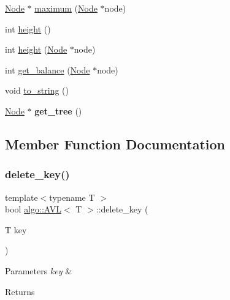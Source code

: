 \begin{DoxyCompactItemize}
\item 
\hyperlink{structalgo_1_1_a_v_l_1_1_node}{Node} $\ast$ \hyperlink{classalgo_1_1_a_v_l_a83534f4b9ca490fba2394d3d649b2175}{maximum} (\hyperlink{structalgo_1_1_a_v_l_1_1_node}{Node} $\ast$node)
\item 
int \hyperlink{classalgo_1_1_a_v_l_af66028b5b5d5522309c39fc6e257cc29}{height} ()
\item 
int \hyperlink{classalgo_1_1_a_v_l_a2a7302a4158b1d05ec14a72ffe334967}{height} (\hyperlink{structalgo_1_1_a_v_l_1_1_node}{Node} $\ast$node)
\item 
int \hyperlink{classalgo_1_1_a_v_l_a4032085e8c8c46ffa860ca4d9f77518e}{get\+\_\+balance} (\hyperlink{structalgo_1_1_a_v_l_1_1_node}{Node} $\ast$node)
\item 
void \hyperlink{classalgo_1_1_a_v_l_a9ba6eb96ef53afb440feaf4b689f298a}{to\+\_\+string} ()
\item 
\mbox{\label{classalgo_1_1_a_v_l_a019894ad803c63de30a867ea0614e357}} 
\hyperlink{structalgo_1_1_a_v_l_1_1_node}{Node} $\ast$ {\bfseries get\+\_\+tree} ()
\end{DoxyCompactItemize}


\subsection{Member Function Documentation}
\mbox{\label{classalgo_1_1_a_v_l_ac276c566a3f90c704395e45d89bd9d8d}} 
\subsubsection{\texorpdfstring{delete\+\_\+key()}{delete\_key()}}
{\footnotesize\ttfamily template$<$typename T $>$ \\
bool \hyperlink{classalgo_1_1_a_v_l}{algo\+::\+A\+VL}$<$ T $>$\+::delete\+\_\+key (\begin{DoxyParamCaption}\item[{T}]{key }\end{DoxyParamCaption})}


\begin{DoxyParams}{Parameters}
{\em key} & \\
\hline
\end{DoxyParams}
\begin{DoxyReturn}{Returns}

\end{DoxyReturn}
\mbox{\label{classalgo_1_1_a_v_l_a4032085e8c8c46ffa860ca4d9f77518e}} 
